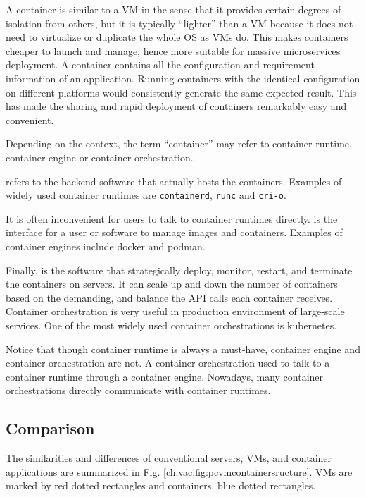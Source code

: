 A container is similar to a VM in the sense that it provides certain degrees of isolation from others, but it is typically ``lighter'' than a VM because it does not need to virtualize or duplicate the whole OS as VMs do. This makes containers cheaper to launch and manage, hence more suitable for massive microservices deployment. A container contains all the configuration and requirement information of an application. Running containers with the identical configuration on different platforms would consistently generate the same expected result. This has made the sharing and rapid deployment of containers remarkably easy and convenient. 

Depending on the context, the term ``container'' may refer to container runtime, container engine or container orchestration.

 refers to the backend software that actually hosts the containers. Examples of widely used container runtimes are \verb|containerd|, \verb|runc| and \verb|cri-o|. 

It is often inconvenient for users to talk to container runtimes directly.  is the interface for a user or software to manage images and containers. Examples of container engines include docker and podman. 

Finally,  is the software that strategically deploy, monitor, restart, and terminate the containers on servers. It can scale up and down the number of containers based on the demanding, and balance the API calls each container receives. Container orchestration is very useful in production environment of large-scale services. One of the most widely used container orchestrations is kubernetes.

Notice that though container runtime is always a must-have, container engine and container orchestration are not. A container orchestration used to talk to a container runtime through a container engine. Nowadays, many container orchestrations directly communicate with container runtimes.

\subsection{Comparison}

The similarities and differences of conventional servers, VMs, and container applications are summarized in Fig. \ref{ch:vac:fig:pcvmcontainersructure}. VMs are marked by red dotted rectangles and containers, blue dotted rectangles.

